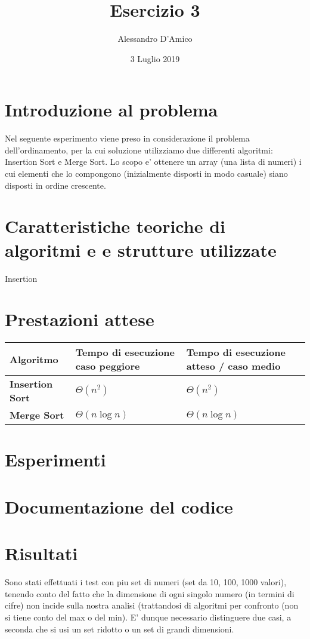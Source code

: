 \documentclass[a4paper]{article}
\title {{\TitleFont Esercizio 3}}
\date{3 Luglio 2019}
\author{{\AuthFont Alessandro D'Amico}}
\begin{document}
\begin{titlingpage}
\maketitle
\end{titlingpage}
\tableofcontents
\newpage
\section{Introduzione al problema}
Nel seguente esperimento viene preso in considerazione il problema dell'ordinamento, per la cui soluzione utilizziamo due differenti algoritmi: Insertion Sort e Merge Sort.
Lo scopo e' ottenere un array (una lista di numeri) i cui elementi che lo compongono (inizialmente disposti in modo casuale) siano disposti in ordine crescente.
\section{Caratteristiche teoriche di algoritmi e e strutture utilizzate}
Insertion
\section{Prestazioni attese}
	\begin{tabularx}{10cm}{|X|X|X|}
	\hline
	Algoritmo & Tempo di esecuzione caso peggiore & Tempo di esecuzione atteso / caso medio \\
	\hline
	\textbf{Insertion Sort} & $\Theta(n^2)$  & $\Theta(n^2)$ \\
	\hline
	\textbf{Merge Sort} &  $\Theta(n\log{}n)$ & $\Theta(n\log{}n)$\\
	\hline
	\end{tabularx}
\section{Esperimenti}
\section{Documentazione del codice}
\newpage
\section{Risultati}
Sono stati effettuati i test con piu set di numeri (set da 10, 100, 1000 valori), tenendo conto del fatto che la dimensione di ogni singolo numero (in termini di cifre) non incide sulla nostra analisi (trattandosi di algoritmi per confronto (non si tiene conto del max o del min). E' dunque necessario distinguere due casi, a seconda che si usi un set ridotto o un set di grandi dimensioni. 
\end{document}
